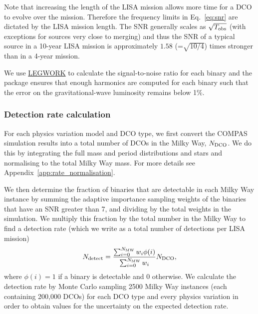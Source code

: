 Note that increasing the length of the LISA mission allows more time for a DCO to evolve over the mission. Therefore the frequency limits in Eq.~\ref{eq:snr} are dictated by the LISA mission length. The SNR generally scales as $\sqrt{T_{\rm obs}}$ (with exceptions for sources very close to merging) and thus the SNR of a typical source in a 10-year LISA mission is approximately $1.58$ (=$\sqrt{10/4}$) times stronger than in a 4-year mission.

We use \href{https://legwork.readthedocs.io/en/latest/}{LEGWORK} to calculate the signal-to-noise ratio for each binary and the package ensures that enough harmonics are computed for each binary such that the error on the gravitational-wave luminosity remains below 1\%.

\subsubsection{Detection rate calculation}
For each physics variation model and DCO type, we first convert the COMPAS simulation results into a total number of DCOs in the Milky Way, $N_{\rm DCO}$. We do this by integrating the full mass and period distributions and stars and normalising to the total Milky Way mass. For more details see Appendix~\ref{app:rate_normalisation}.

We then determine the fraction of binaries that are detectable in each Milky Way instance by summing the adaptive importance sampling weights of the binaries that have an SNR greater than 7, and dividing by the total weights in the simulation. We multiply this fraction by the total number in the Milky Way to find a detection rate (which we write as a total number of detections per LISA mission)
\begin{equation}
    N_{\rm detect} = \frac{\sum_{i = 0}^{N_{\rm MW}} w_i \phi(i)}{\sum_{i = 0}^{N_{\rm MW}} w_i} N_{\rm DCO},
\end{equation}
where $\phi(i) = 1$ if a binary is detectable and $0$ otherwise. We calculate the detection rate by Monte Carlo sampling 2500 Milky Way instances (each containing 200,000 DCOs) for each DCO type and every physics variation in order to obtain values for the uncertainty on the expected detection rate.